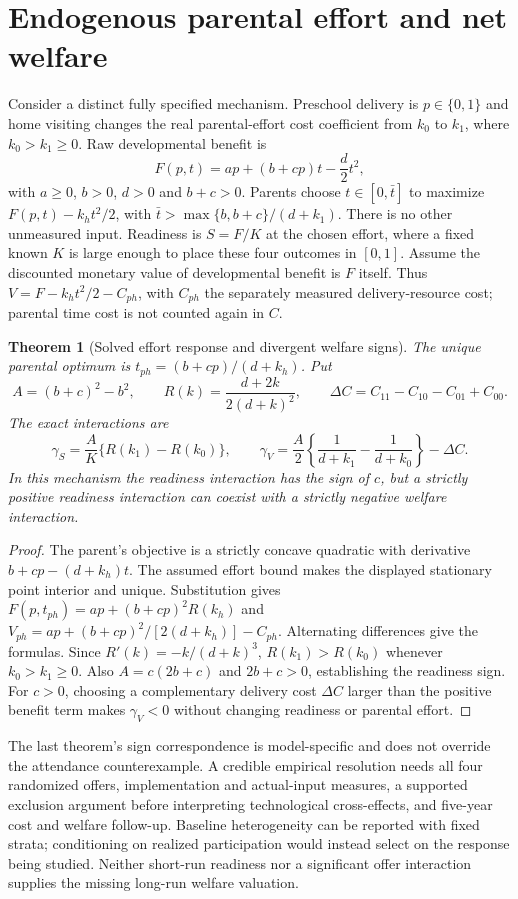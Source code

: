 \documentclass[11pt]{article}
\newtheorem{theorem}{Theorem}
\theoremstyle{remark}\newtheorem{remark}[theorem]{Remark}
\begin{document}
\section*{Endogenous parental effort and net welfare}
Consider a distinct fully specified mechanism. Preschool delivery is $p\in\{0,1\}$ and home visiting changes the real parental-effort cost coefficient from $k_0$ to $k_1$, where $k_0>k_1\ge0$. Raw developmental benefit is
\[
 F(p,t)=ap+(b+cp)t-\frac d2t^2,
\]
with $a\ge0$, $b>0$, $d>0$ and $b+c>0$. Parents choose $t\in[0,\bar t]$ to maximize $F(p,t)-k_ht^2/2$, with $\bar t>\max\{b,b+c\}/(d+k_1)$. There is no other unmeasured input. Readiness is $S=F/K$ at the chosen effort, where a fixed known $K$ is large enough to place these four outcomes in $[0,1]$. Assume the discounted monetary value of developmental benefit is $F$ itself. Thus $V=F-k_ht^2/2-C_{ph}$, with $C_{ph}$ the separately measured delivery-resource cost; parental time cost is not counted again in $C$.

\begin{theorem}[Solved effort response and divergent welfare signs]
The unique parental optimum is $t_{ph}=(b+cp)/(d+k_h)$. Put
\[
 A=(b+c)^2-b^2,\qquad R(k)=\frac{d+2k}{2(d+k)^2},\qquad
 \Delta C=C_{11}-C_{10}-C_{01}+C_{00}.
\]
The exact interactions are
\[
 \gamma_S=\frac A K\{R(k_1)-R(k_0)\},\qquad
 \gamma_V=\frac A2\left\{\frac1{d+k_1}-\frac1{d+k_0}\right\}-\Delta C.
\]
In this mechanism the readiness interaction has the sign of $c$, but a strictly positive readiness interaction can coexist with a strictly negative welfare interaction.
\end{theorem}
\begin{proof}
The parent's objective is a strictly concave quadratic with derivative $b+cp-(d+k_h)t$. The assumed effort bound makes the displayed stationary point interior and unique. Substitution gives $F(p,t_{ph})=ap+(b+cp)^2R(k_h)$ and $V_{ph}=ap+(b+cp)^2/[2(d+k_h)]-C_{ph}$. Alternating differences give the formulas. Since $R'(k)=-k/(d+k)^3$, $R(k_1)>R(k_0)$ whenever $k_0>k_1\ge0$. Also $A=c(2b+c)$ and $2b+c>0$, establishing the readiness sign. For $c>0$, choosing a complementary delivery cost $\Delta C$ larger than the positive benefit term makes $\gamma_V<0$ without changing readiness or parental effort.
\end{proof}

The last theorem's sign correspondence is model-specific and does not override the attendance counterexample. A credible empirical resolution needs all four randomized offers, implementation and actual-input measures, a supported exclusion argument before interpreting technological cross-effects, and five-year cost and welfare follow-up. Baseline heterogeneity can be reported with fixed strata; conditioning on realized participation would instead select on the response being studied. Neither short-run readiness nor a significant offer interaction supplies the missing long-run welfare valuation.
\end{document}
